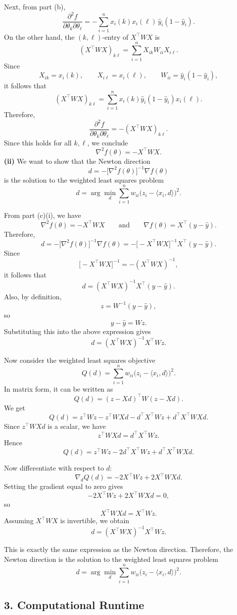 \documentclass{article}
\begin{document}
Next, from part (b),
\[
\frac{\partial^2 f}{\partial\theta_k\partial\theta_\ell}
=
-\sum_{i=1}^n x_i(k)x_i(\ell)\,\hat y_i(1-\hat y_i).
\]
On the other hand, the \((k,\ell)\)-entry of \(X^\top W X\) is
\[
(X^\top W X)_{k\ell}
=
\sum_{i=1}^n X_{ik}W_{ii}X_{i\ell}.
\]
Since
\[
X_{ik}=x_i(k),
\qquad
X_{i\ell}=x_i(\ell),
\qquad
W_{ii}=\hat y_i(1-\hat y_i),
\]
it follows that
\[
(X^\top W X)_{k\ell}
=
\sum_{i=1}^n x_i(k)\hat y_i(1-\hat y_i)x_i(\ell).
\]
Therefore,
\[
\frac{\partial^2 f}{\partial\theta_k\partial\theta_\ell}
=
-(X^\top W X)_{k\ell}.
\]
Since this holds for all \(k,\ell\), we conclude
\[
\nabla^2 f(\theta)=-X^\top W X.
\]
\textbf{(ii)} We want to show that the Newton direction
\[
d=-\bigl[\nabla^2 f(\theta)\bigr]^{-1}\nabla f(\theta)
\]
is the solution to the weighted least squares problem
\[
d=\arg\min_d \sum_{i=1}^n w_{ii}\bigl(z_i-\langle x_i,d\rangle\bigr)^2.
\]

From part (c)(i), we have
\[
\nabla^2 f(\theta)=-X^\top W X
\qquad\text{and}\qquad
\nabla f(\theta)=X^\top(y-\hat y).
\]
Therefore,
\[
d
=
-\bigl[\nabla^2 f(\theta)\bigr]^{-1}\nabla f(\theta)
=
-\bigl[-X^\top W X\bigr]^{-1}X^\top(y-\hat y).
\]
Since
\[
\bigl[-X^\top W X\bigr]^{-1}=-(X^\top W X)^{-1},
\]
it follows that
\[
d
=
(X^\top W X)^{-1}X^\top(y-\hat y).
\]
Also, by definition,
\[
z=W^{-1}(y-\hat y),
\]
so
\[
y-\hat y=Wz.
\]
Substituting this into the above expression gives
\[
d
=
(X^\top W X)^{-1}X^\top W z.
\]

Now consider the weighted least squares objective
\[
Q(d)=\sum_{i=1}^n w_{ii}\bigl(z_i-\langle x_i,d\rangle\bigr)^2.
\]
In matrix form, it can be written as
\[
Q(d)=(z-Xd)^\top W(z-Xd).
\]
We get
\[
Q(d)
=
z^\top W z-z^\top WXd-d^\top X^\top W z+d^\top X^\top W X d.
\]
Since \(z^\top WXd\) is a scalar, we have
\[
z^\top WXd=d^\top X^\top W z.
\]
Hence
\[
Q(d)
=
z^\top W z-2d^\top X^\top W z+d^\top X^\top W X d.
\]

Now differentiate with respect to \(d\):
\[
\nabla_d Q(d)
=
-2X^\top W z+2X^\top W X d.
\]
Setting the gradient equal to zero gives
\[
-2X^\top W z+2X^\top W X d=0,
\]
so
\[
X^\top W X d=X^\top W z.
\]
Assuming \(X^\top W X\) is invertible, we obtain
\[
d=(X^\top W X)^{-1}X^\top W z.
\]

This is exactly the same expression as the Newton direction. Therefore, the Newton direction is the solution to the weighted least squares problem
\[
d=\arg\min_d \sum_{i=1}^n w_{ii}\bigl(z_i-\langle x_i,d\rangle\bigr)^2.
\]


\subsection*{3. Computational Runtime}
\end{document}
